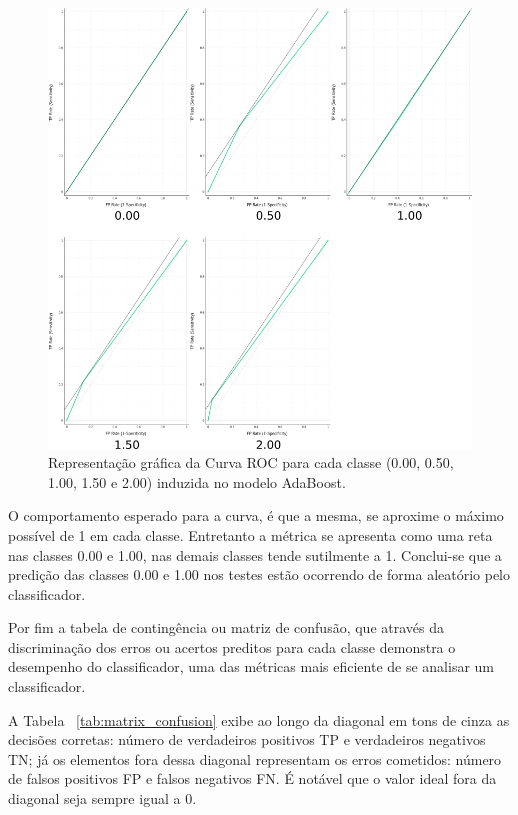 \begin{figure}[H]
\begin{center}
    \includegraphics[scale=0.75]{images/roc.png}
\end{center}
\caption{Representação gráfica da Curva ROC para cada classe (0.00, 0.50, 1.00, 1.50 e 2.00) induzida no modelo AdaBoost.}
\label{fig:roc}
\end{figure}

O comportamento esperado para a curva, é que a mesma, se aproxime o máximo possível de 1 em cada classe. Entretanto a métrica se apresenta como uma reta nas classes 0.00 e 1.00, nas demais classes tende sutilmente a 1. Conclui-se que a predição das classes 0.00 e 1.00 nos testes estão ocorrendo de forma aleatório pelo classificador.

Por fim a tabela de contingência ou matriz de confusão, que através da discriminação dos erros ou acertos preditos para cada classe demonstra o desempenho do classificador, uma das métricas mais eficiente de se analisar um classificador. 

A Tabela ~\ref{tab:matrix_confusion} exibe ao longo da diagonal em tons de cinza as decisões corretas: número de verdadeiros positivos TP e verdadeiros negativos TN; já os elementos fora dessa diagonal representam os erros cometidos: número de falsos positivos FP e falsos negativos FN. É notável que o valor ideal fora da diagonal seja sempre igual a 0.  

